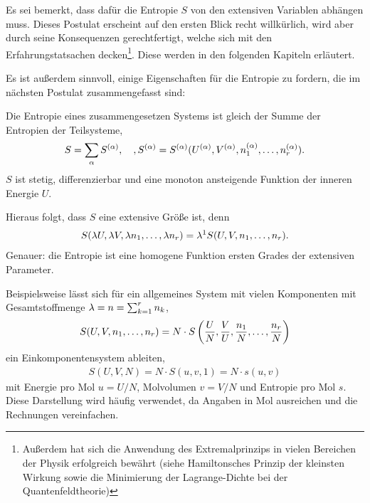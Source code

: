 Es sei bemerkt, dass dafür die Entropie $S$ von den extensiven Variablen abhängen muss. Dieses Postulat erscheint auf den ersten Blick recht willkürlich, wird aber durch seine Konsequenzen gerechtfertigt, welche sich mit den Erfahrungstatsachen decken\footnote{Außerdem hat sich die Anwendung des Extremalprinzips in vielen Bereichen der Physik erfolgreich bewährt (siehe Hamiltonsches Prinzip der kleinsten Wirkung sowie die Minimierung der Lagrange-Dichte bei der Quantenfeldtheorie)}. Diese werden in den folgenden Kapiteln erläutert. 

Es ist außerdem sinnvoll, einige Eigenschaften für die Entropie zu fordern, die im nächsten Postulat zusammengefasst sind:
\begin{postulate}
    \label{post:eigenschaften_entropie}
    Die Entropie eines zusammengesetzen Systems ist gleich der Summe der Entropien der Teilsysteme,
    \begin{align*}
        S =\sum_\alpha S^{(\alpha)}, \quad, S^{(\alpha)} = S^{(\alpha)}(U^{(\alpha)},V^{(\alpha)},n_1^{(\alpha)},\ldots, n_r^{(\alpha)}). 
    \end{align*}
    $S$ ist stetig, differenzierbar und eine monoton ansteigende Funktion der inneren Energie $U$. 
\end{postulate}

Hieraus folgt, dass $S$ eine extensive Größe ist, denn 
\begin{align*}
    S(\lambda U,\lambda V,\lambda n_1,\ldots, \lambda n_r) = \lambda^1 S(U,V,n_1, \ldots,n_r). 
\end{align*}
Genauer: die Entropie ist eine  homogene Funktion ersten Grades der extensiven Parameter. 

Beispielsweise lässt sich für ein allgemeines System mit vielen Komponenten mit Gesamtstoffmenge $\lambda=n=\sum_{k=1}^rn_k$,
\begin{align*}
    S(U,V,n_1, \dots , n_r) = N\cdot S\left(\frac{U}{N},\frac{V}{U},\frac{n_1}{N}, \dots , \frac{n_r}{N}\right)
\end{align*}
ein Einkomponentensystem ableiten,
\begin{align*}
    S(U,V,N) = N\cdot S(u,v,1) = N\cdot s(u,v)
\end{align*}
mit Energie pro Mol $u=U/N$, Molvolumen $v=V/N$ und Entropie pro Mol $s$. Diese Darstellung wird häufig verwendet, da Angaben in Mol ausreichen und die Rechnungen vereinfachen. 


